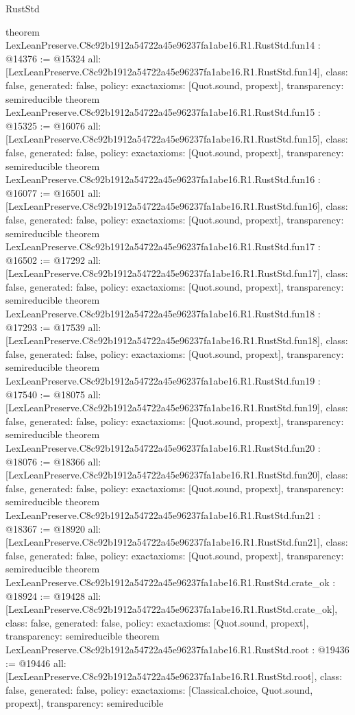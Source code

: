 \begin{lexlean}{RustStd}
\begin{coremodule}
{}
theorem LexLeanPreserve.C8c92b1912a54722a45e96237fa1abe16.R1.RustStd.fun14 : @14376 := @15324 {
  all: [LexLeanPreserve.C8c92b1912a54722a45e96237fa1abe16.R1.RustStd.fun14],
  class: false,
  generated: false,
  policy: exact{axioms: [Quot.sound, propext]},
  transparency: semireducible
}
theorem LexLeanPreserve.C8c92b1912a54722a45e96237fa1abe16.R1.RustStd.fun15 : @15325 := @16076 {
  all: [LexLeanPreserve.C8c92b1912a54722a45e96237fa1abe16.R1.RustStd.fun15],
  class: false,
  generated: false,
  policy: exact{axioms: [Quot.sound, propext]},
  transparency: semireducible
}
theorem LexLeanPreserve.C8c92b1912a54722a45e96237fa1abe16.R1.RustStd.fun16 : @16077 := @16501 {
  all: [LexLeanPreserve.C8c92b1912a54722a45e96237fa1abe16.R1.RustStd.fun16],
  class: false,
  generated: false,
  policy: exact{axioms: [Quot.sound, propext]},
  transparency: semireducible
}
theorem LexLeanPreserve.C8c92b1912a54722a45e96237fa1abe16.R1.RustStd.fun17 : @16502 := @17292 {
  all: [LexLeanPreserve.C8c92b1912a54722a45e96237fa1abe16.R1.RustStd.fun17],
  class: false,
  generated: false,
  policy: exact{axioms: [Quot.sound, propext]},
  transparency: semireducible
}
theorem LexLeanPreserve.C8c92b1912a54722a45e96237fa1abe16.R1.RustStd.fun18 : @17293 := @17539 {
  all: [LexLeanPreserve.C8c92b1912a54722a45e96237fa1abe16.R1.RustStd.fun18],
  class: false,
  generated: false,
  policy: exact{axioms: [Quot.sound, propext]},
  transparency: semireducible
}
theorem LexLeanPreserve.C8c92b1912a54722a45e96237fa1abe16.R1.RustStd.fun19 : @17540 := @18075 {
  all: [LexLeanPreserve.C8c92b1912a54722a45e96237fa1abe16.R1.RustStd.fun19],
  class: false,
  generated: false,
  policy: exact{axioms: [Quot.sound, propext]},
  transparency: semireducible
}
theorem LexLeanPreserve.C8c92b1912a54722a45e96237fa1abe16.R1.RustStd.fun20 : @18076 := @18366 {
  all: [LexLeanPreserve.C8c92b1912a54722a45e96237fa1abe16.R1.RustStd.fun20],
  class: false,
  generated: false,
  policy: exact{axioms: [Quot.sound, propext]},
  transparency: semireducible
}
theorem LexLeanPreserve.C8c92b1912a54722a45e96237fa1abe16.R1.RustStd.fun21 : @18367 := @18920 {
  all: [LexLeanPreserve.C8c92b1912a54722a45e96237fa1abe16.R1.RustStd.fun21],
  class: false,
  generated: false,
  policy: exact{axioms: [Quot.sound, propext]},
  transparency: semireducible
}
theorem LexLeanPreserve.C8c92b1912a54722a45e96237fa1abe16.R1.RustStd.crate_ok : @18924 := @19428 {
  all: [LexLeanPreserve.C8c92b1912a54722a45e96237fa1abe16.R1.RustStd.crate_ok],
  class: false,
  generated: false,
  policy: exact{axioms: [Quot.sound, propext]},
  transparency: semireducible
}
theorem LexLeanPreserve.C8c92b1912a54722a45e96237fa1abe16.R1.RustStd.root : @19436 := @19446 {
  all: [LexLeanPreserve.C8c92b1912a54722a45e96237fa1abe16.R1.RustStd.root],
  class: false,
  generated: false,
  policy: exact{axioms: [Classical.choice, Quot.sound, propext]},
  transparency: semireducible
}


\end{coremodule}
\end{lexlean}
